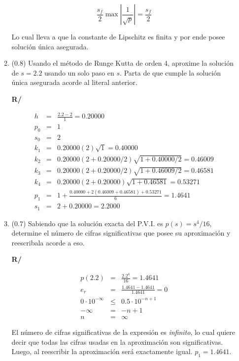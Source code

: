 \documentclass[12pt]{article}
\begin{document}
\begin{enumerate}[leftmargin=*,widest=9]
\begin{enumerate}[label=\alph*]
\[
\frac{s_f}{2}\max\left\vert \frac{1}{\sqrt{p}} \right\vert = \frac{s_f}{2}
\]

Lo cual lleva a que la constante de Lipschitz es finita y por ende posee solución única asegurada.

    \item (\(0.8\)) Usando el método de Runge Kutta de orden 4, aproxime la solución de \(s=2.2\) usando un solo paso en \(s\). Parta de que cumple la solución única asegurada acorde al literal anterior.

    \textbf{R/}

    \begin{eqnarray*}
h &=& \frac{2.2-2}{1} = 0.20000 \\
p_0 &=& 1\\
s_0 &=& 2\\
k_1 & = & 0.20000 (2)\sqrt{1} = 0.40000\\
k_2 &=& 0.20000 (2 + 0.20000/2)\sqrt{1 + 0.40000/2} = 0.46009\\
k_3 &=& 0.20000 (2 + 0.20000/2)\sqrt{1 + 0.46009/2} = 0.46581\\
k_4 &=& 0.20000 (2 + 0.20000)\sqrt{1 + 0.46581} = 0.53271\\
p_1 &=& 1 + \frac{0.40000 + 2(0.46009+0.46581)+0.53271}{6}=1.4641\\
s_1 &=& 2+0.20000 = 2.2000
    \end{eqnarray*}

    \item (\(0.7\)) Sabiendo que la solución exacta del P.V.I. es \(p(s)=s^4/16\), determine el número de cifras significativas que posee su aproximación y reescribala acorde a eso.

\textbf{R/}

\begin{eqnarray*}
p(2.2) &=& \frac{2.2^4}{16} = 1.4641\\
e_r &=& \frac{1.4641-1.4641}{1.4641}=0\\
0 \cdot 10^{-\infty} &\leq& 0.5 \cdot 10^{-n+1}\\
-\infty &=& -n + 1\\
n &=& \infty
\end{eqnarray*}

El número de cifras significativas de la expresión es \textit{infinito}, lo cual quiere decir que todas las cifras usadas en la aproximación son significativas. Luego, al reescribir la aproximación será exactamente igual. \(p_1 =1.4641\).

    \end{enumerate}


\end{enumerate}
\end{document}

